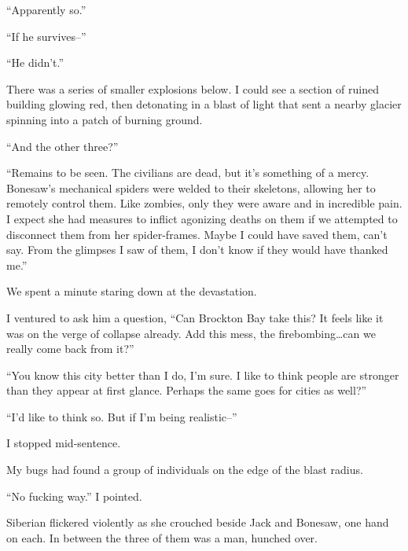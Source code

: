 ``Apparently so.''



``If he survives--''



``He didn't.''



There was a series of smaller explosions below.  I could see a section of ruined building glowing red, then detonating in a blast of light that sent a nearby glacier spinning into a patch of burning ground.



``And the other three?''



``Remains to be seen.  The civilians are dead, but it's something of a mercy.  Bonesaw's mechanical spiders were welded to their skeletons, allowing her to remotely control them.  Like zombies, only they were aware and in incredible pain.  I expect she had measures to inflict agonizing deaths on them if we attempted to disconnect them from her spider-frames.  Maybe I could have saved them, can't say.  From the glimpses I saw of them, I don't know if they would have thanked me.''



We spent a minute staring down at the devastation.



I ventured to ask him a question, ``Can Brockton Bay take this?  It feels like it was on the verge of collapse already.  Add this mess, the firebombing\ldots can we really come back from it?''



``You know this city better than I do, I'm sure.  I like to think people are stronger than they appear at first glance.  Perhaps the same goes for cities as well?''



``I'd like to think so.  But if I'm being realistic--''



I stopped mid-sentence.



My bugs had found a group of individuals on the edge of the blast radius.



``No fucking way.''  I pointed.



Siberian flickered violently as she crouched beside Jack and Bonesaw, one hand on each.  In between the three of them was a man, hunched over.



